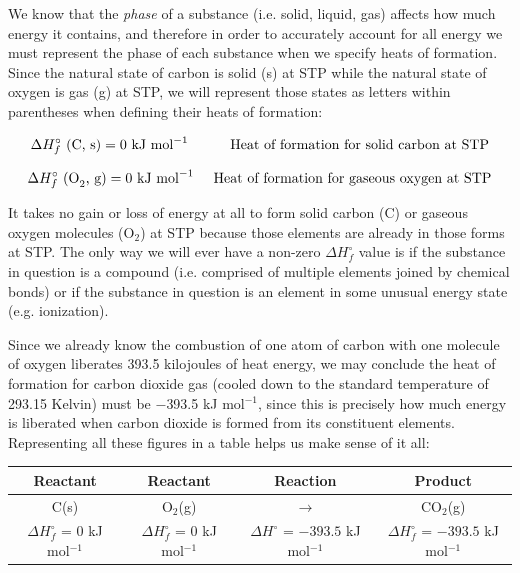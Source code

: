 We know that the \textit{phase} of a substance (i.e. solid, liquid, gas) affects how much energy it contains, and therefore in order to accurately account for all energy we must represent the phase of each substance when we specify heats of formation.  Since the natural state of carbon is solid (s) at STP while the natural state of oxygen is gas (g) at STP, we will represent those states as letters within parentheses when defining their heats of formation:

$$\Delta H_f^{\circ} \hbox{ (C, s)} = 0 \hbox{ kJ mol}^{-1} \hskip 30pt \hbox{Heat of formation for solid carbon at STP}$$

$$\Delta H_f^{\circ} \hbox{ (O}_2 \hbox{, g)} = 0 \hbox{ kJ mol}^{-1} \hskip 14pt \hbox{Heat of formation for gaseous oxygen at STP}$$

It takes no gain or loss of energy at all to form solid carbon (C) or gaseous oxygen molecules (O$_{2}$) at STP because those elements are already in those forms at STP.  The only way we will ever have a non-zero $\Delta H_f^{\circ}$ value is if the substance in question is a compound (i.e. comprised of multiple elements joined by chemical bonds) or if the substance in question is an element in some unusual energy state (e.g. ionization).

\vskip 10pt

\filbreak

Since we already know the combustion of one atom of carbon with one molecule of oxygen liberates 393.5 kilojoules of heat energy, we may conclude the heat of formation for carbon dioxide gas (cooled down to the standard temperature of 293.15 Kelvin) must be $-$393.5 kJ mol$^{-1}$, since this is precisely how much energy is liberated when carbon dioxide is formed from its constituent elements.  Representing all these figures in a table helps us make sense of it all:

\begin{center}
\begin{tabular}{| c | c | c | c |}
\hline 
\textbf{Reactant} & \textbf{Reactant} & \textbf{Reaction} & \textbf{Product} \\[3pt] \hline
C(s) & O$_{2}$(g) & $\to$ & CO$_{2}$(g) \\[3pt] \hline 
$\Delta H_f^{\circ}$ = 0 kJ mol$^{-1}$ & $\Delta H_f^{\circ}$ = 0 kJ mol$^{-1}$ & $\Delta H^{\circ}$ = $-393.5$ kJ mol$^{-1}$ & $\Delta H_f^{\circ}$ = $-393.5$ kJ mol$^{-1}$ \\[3pt] \hline
\end{tabular}
\end{center}


